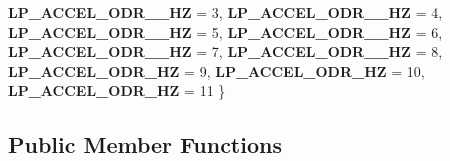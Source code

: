 \begin{DoxyCompactItemize}
{\bfseries L\+P\+\_\+\+A\+C\+C\+E\+L\+\_\+\+O\+D\+R\+\_\+\_\+HZ} = 3, 
\newline
{\bfseries L\+P\+\_\+\+A\+C\+C\+E\+L\+\_\+\+O\+D\+R\+\_\+\_\+HZ} = 4, 
{\bfseries L\+P\+\_\+\+A\+C\+C\+E\+L\+\_\+\+O\+D\+R\+\_\+\_\+HZ} = 5, 
{\bfseries L\+P\+\_\+\+A\+C\+C\+E\+L\+\_\+\+O\+D\+R\+\_\+\_\+HZ} = 6, 
{\bfseries L\+P\+\_\+\+A\+C\+C\+E\+L\+\_\+\+O\+D\+R\+\_\+\_\+HZ} = 7, 
\newline
{\bfseries L\+P\+\_\+\+A\+C\+C\+E\+L\+\_\+\+O\+D\+R\+\_\+\_\+HZ} = 8, 
{\bfseries L\+P\+\_\+\+A\+C\+C\+E\+L\+\_\+\+O\+D\+R\+\_\+HZ} = 9, 
{\bfseries L\+P\+\_\+\+A\+C\+C\+E\+L\+\_\+\+O\+D\+R\+\_\+HZ} = 10, 
{\bfseries L\+P\+\_\+\+A\+C\+C\+E\+L\+\_\+\+O\+D\+R\+\_\+HZ} = 11
 \}
\end{DoxyCompactItemize}
\subsection*{Public Member Functions}
